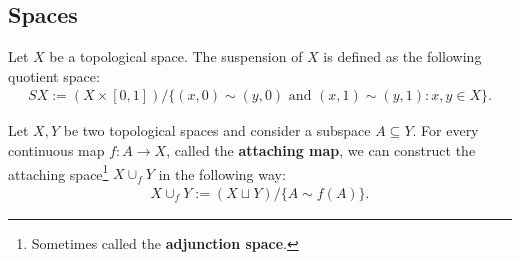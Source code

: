 
\subsection{Spaces}

    \begin{construct}[Suspension]\label{topology:suspension}
        Let $X$ be a topological space. The suspension of $X$ is defined as the following quotient space:
        \begin{gather}
            SX := (X\times [0, 1])/\big\{(x, 0) \sim (y, 0)\text{ and }(x, 1) \sim (y, 1):x, y\in X\big\}.
        \end{gather}
    \end{construct}

    \begin{construct}\label{topology:attaching_space}
        Let $X, Y$ be two topological spaces and consider a subspace $A\subseteq Y$. For every continuous map $f:A\rightarrow X$, called the \textbf{attaching map}, we can construct the attaching space\footnote{Sometimes called the \textbf{adjunction space}.} $X\cup_f Y$ in the following way:
        \begin{gather}
            X\cup_f Y := (X\sqcup Y)/\{A\sim f(A)\}.
        \end{gather}
    \end{construct}

